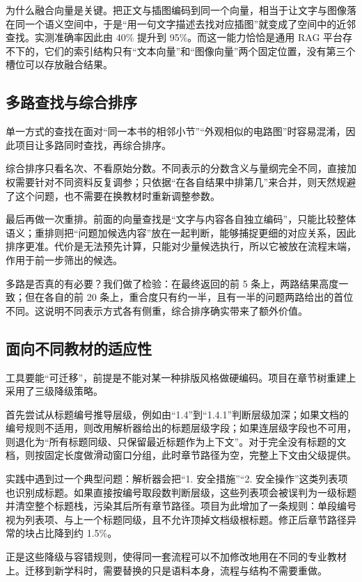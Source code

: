 \documentclass[12pt,a4paper]{ctexart}
\begin{document}
为什么融合向量是关键。把正文与插图编码到同一个向量，相当于让文字与图像落在同一个语义空间中，于是“用一句文字描述去找对应插图”就变成了空间中的近邻查找。实测准确率因此由 40\% 提升到 95\%。而这一能力恰恰是通用 RAG 平台存不下的，它们的索引结构只有“文本向量”和“图像向量”两个固定位置，没有第三个槽位可以存放融合结果。

\subsection{多路查找与综合排序}

单一方式的查找在面对“同一本书的相邻小节”“外观相似的电路图”时容易混淆，因此项目让多路同时查找，再综合排序。

综合排序只看名次、不看原始分数。不同表示的分数含义与量纲完全不同，直接加权需要针对不同资料反复调参；只依据“在各自结果中排第几”来合并，则天然规避了这个问题，也不需要在换教材时重新调整参数。

最后再做一次重排。前面的向量查找是“文字与内容各自独立编码”，只能比较整体语义；重排则把“问题加候选内容”放在一起判断，能够捕捉更细的对应关系，因此排序更准。代价是无法预先计算，只能对少量候选执行，所以它被放在流程末端，作用于前一步筛出的候选。

多路是否真的有必要？我们做了检验：在最终返回的前 5 条上，两路结果高度一致；但在各自的前 20 条上，重合度只有约一半，且有一半的问题两路给出的首位不同。这说明不同表示方式各有侧重，综合排序确实带来了额外价值。

\subsection{面向不同教材的适应性}

工具要能“可迁移”，前提是不能对某一种排版风格做硬编码。项目在章节树重建上采用了三级降级策略。

首先尝试从标题编号推导层级，例如由“1.4”到“1.4.1”判断层级加深；如果文档的编号规则不适用，则改用解析器给出的标题层级字段；如果连层级字段也不可用，则退化为“所有标题同级、只保留最近标题作为上下文”。对于完全没有标题的文档，则按固定长度做滑动窗口分组，此时章节路径为空，完整上下文由父级提供。

实践中遇到过一个典型问题：解析器会把“1. 安全措施”“2. 安全操作”这类列表项也识别成标题。如果直接按编号取段数判断层级，这些列表项会被误判为一级标题并清空整个标题栈，污染其后所有章节路径。项目为此增加了一条规则：单段编号视为列表项、与上一个标题同级，且不允许顶掉文档级根标题。修正后章节路径异常的块占比降到约 1.5\%。

正是这些降级与容错规则，使得同一套流程可以不加修改地用在不同的专业教材上。迁移到新学科时，需要替换的只是语料本身，流程与结构不需要重做。
\end{document}
